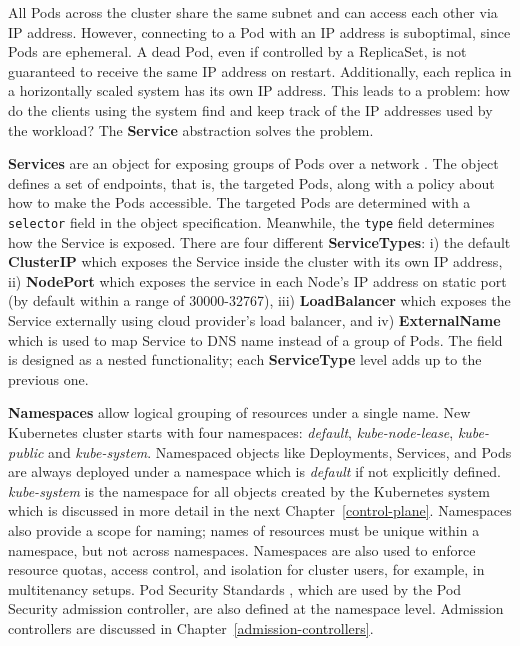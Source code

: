 \documentclass[english, 12pt, a4paper, sci, utf8, a-2b, online]{aaltothesis}
\newcommand{\mycomment}[3]{\textcolor{#1}{#2:~#3}}
\newcommand{\jb}[1]{\noindent\mycomment{aaltoRed}{JB}{#1}}
\begin{document}
All Pods across the cluster share the same subnet and can access each other via IP address.
However, connecting to a Pod with an IP address is suboptimal, since Pods are ephemeral.
A dead Pod, even if controlled by a ReplicaSet, is not guaranteed to receive the same IP address on restart.
Additionally, each replica in a horizontally scaled system has its own IP address.
This leads to a problem: how do the clients using the system find and keep track of the IP addresses used by the workload? The \textbf{Service} abstraction solves the problem.

\textbf{Services} are an object for exposing groups of Pods over a network \cite{k8s-docs-services}.
The object defines a set of endpoints, that is, the targeted Pods, along with a policy about how to make the Pods accessible.
The targeted Pods are determined with a \lstinline{selector} field in the object specification.
Meanwhile, the \lstinline{type} field determines how the Service is exposed.
There are four different \textbf{ServiceTypes}: i) the default \textbf{ClusterIP} which exposes the Service inside the cluster with its own IP address, ii) \textbf{NodePort} which exposes the service in each Node's IP address on static port (by default within a range of 30000-32767), iii) \textbf{LoadBalancer} which exposes the Service externally using cloud provider's load balancer, and iv) \textbf{ExternalName} which is used to map Service to DNS name instead of a group of Pods.
The field is designed as a nested functionality; each \textbf{ServiceType} level adds up to the previous one.


\textbf{Namespaces} allow logical grouping of resources under a single name.
New Kubernetes cluster starts with four namespaces: \emph{default}, \emph{kube-node-lease}, \emph{kube-public} and \emph{kube-system}.
Namespaced objects like Deployments, Services, and Pods are always deployed under a namespace which is \emph{default} if not explicitly defined.
\emph{kube-system} is the namespace for all objects created by the Kubernetes system which is discussed in more detail in the next Chapter~\ref{control-plane}.
Namespaces also provide a scope for naming; names of resources must be unique within a namespace, but not across namespaces.
Namespaces are also used to enforce resource quotas, access control, and isolation for cluster users, for example, in multitenancy setups.
Pod Security Standards \cite{k8s-docs-pss}, which are used by the Pod Security admission controller, are also defined at the namespace level.
Admission controllers are discussed in Chapter~\ref{admission-controllers}.
\end{document}
